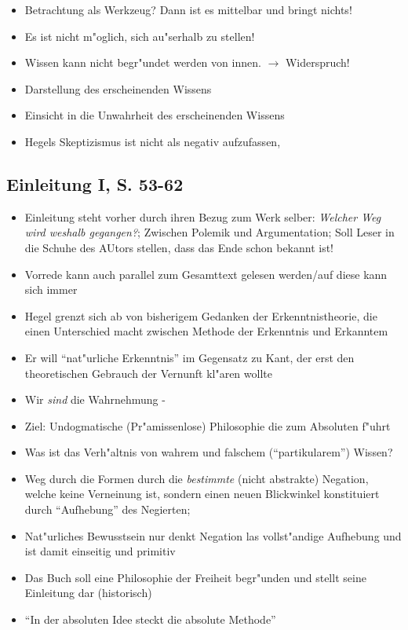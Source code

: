 \documentclass[emulatestandardclasses]{scrartcl}
\begin{document}
\begin{itemize}
  \item Betrachtung als Werkzeug? Dann ist es mittelbar und bringt nichts!
  \item Es ist nicht m"oglich, sich au"serhalb zu stellen!
  \item Wissen kann nicht begr"undet werden von innen. $\rightarrow$ Widerspruch!
  \item Darstellung des erscheinenden Wissens
  \item Einsicht in die Unwahrheit des erscheinenden Wissens
  \item Hegels Skeptizismus ist nicht als negativ aufzufassen, 
\end{itemize}

\subsection{Einleitung I, S. 53-62}

\begin{itemize}
  \item Einleitung steht vorher durch ihren Bezug zum Werk selber: \emph{Welcher Weg wird weshalb gegangen?}; Zwischen Polemik und Argumentation; Soll Leser in die Schuhe des AUtors stellen, dass das Ende schon bekannt ist!
  \item Vorrede kann auch parallel zum Gesamttext gelesen werden/auf diese kann sich immer
  \item Hegel grenzt sich ab von bisherigem Gedanken der Erkenntnistheorie, die einen Unterschied macht zwischen Methode der Erkenntnis und Erkanntem
  \item Er will "`nat"urliche Erkenntnis"' im Gegensatz zu Kant, der erst den theoretischen Gebrauch der Vernunft kl"aren wollte
  \item Wir \emph{sind} die Wahrnehmung - 
  \item Ziel: Undogmatische (Pr"amissenlose) Philosophie die zum Absoluten f"uhrt
  \item Was ist das Verh"altnis von wahrem und falschem ("`partikularem"') Wissen?
  \item Weg durch die Formen durch die \emph{bestimmte} (nicht abstrakte) Negation, welche keine Verneinung ist, sondern einen neuen Blickwinkel konstituiert durch "`Aufhebung"' des Negierten; 
  \item Nat"urliches Bewusstsein nur denkt Negation las vollst"andige Aufhebung und ist damit einseitig und primitiv
  \item Das Buch soll eine Philosophie der Freiheit begr"unden und stellt seine Einleitung dar (historisch)
  \item "`In der absoluten Idee steckt die absolute Methode"'
\end{itemize}
\end{document}
